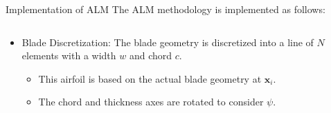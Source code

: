 \documentclass[10pt]{beamer}
\begin{document}
\begin{frame}{Implementation of ALM}
The ALM methodology is implemented as follows:
\begin{columns}
\begin{column}{0.90\textwidth}
\begin{itemize}
\item[\ding{252}] {\color{um6pcolor} Blade Discretization}: The blade geometry is discretized into a line of $N$ elements with a width $w$ and chord $c$.
\begin{itemize}
\item[\ding{212}] This airfoil is based on the actual blade geometry at $\mathbf{x}_i$.
\item[\ding{212}] The chord and thickness axes are rotated to consider $\psi$.
\end{itemize}
\end{itemize}
\end{column}
\begin{column}{0.20\textwidth}
\end{column}
\end{columns}
\noindent\makebox[\linewidth]{\rule{\paperwidth}{0.4pt}}
\begin{columns}
\begin{column}{0.90\textwidth}
\begin{itemize}

\end{itemize}
\end{column}
\end{columns}
\end{frame}
\end{document}
